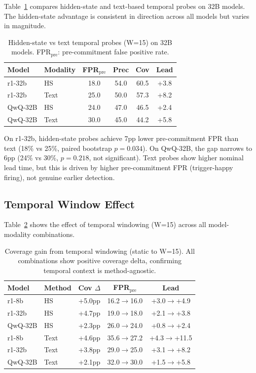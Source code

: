 \documentclass[11pt,a4paper]{article}
\begin{document}
Table~\ref{tab:hs_vs_text} compares hidden-state and text-based temporal probes on 32B models. The hidden-state advantage is consistent in direction across all models but varies in magnitude.

\begin{table}[t]
\centering
\small
\caption{Hidden-state vs text temporal probes (W=15) on 32B models. FPR$_\text{pre}$: pre-commitment false positive rate.}
\label{tab:hs_vs_text}
\begin{tabular}{llcccc}
\toprule
Model & Modality & FPR$_\text{pre}$ & Prec & Cov & Lead \\
\midrule
r1-32b & HS & 18.0 & 54.0 & 60.5 & +3.8 \\
r1-32b & Text & 25.0 & 50.0 & 57.3 & +8.2 \\
\midrule
QwQ-32B & HS & 24.0 & 47.0 & 46.5 & +2.4 \\
QwQ-32B & Text & 30.0 & 45.0 & 44.2 & +5.8 \\
\bottomrule
\end{tabular}
\end{table}

On r1-32b, hidden-state probes achieve 7pp lower pre-commitment FPR than text (18\% vs 25\%, paired bootstrap $p=0.034$). On QwQ-32B, the gap narrows to 6pp (24\% vs 30\%, $p=0.218$, not significant). Text probes show higher nominal lead time, but this is driven by higher pre-commitment FPR (trigger-happy firing), not genuine earlier detection.

\subsection{Temporal Window Effect}

Table~\ref{tab:temporal} shows the effect of temporal windowing (W=15) across all model-modality combinations.

\begin{table}[t]
\centering
\small
\caption{Coverage gain from temporal windowing (static to W=15). All combinations show positive coverage delta, confirming temporal context is method-agnostic.}
\label{tab:temporal}
\begin{tabular}{llccc}
\toprule
Model & Method & Cov $\Delta$ & FPR$_\text{pre}$ & Lead \\
\midrule
r1-8b & HS & +5.0pp & 16.2$\to$16.0 & +3.0$\to$+4.9 \\
r1-32b & HS & +4.7pp & 19.0$\to$18.0 & +2.1$\to$+3.8 \\
QwQ-32B & HS & +2.3pp & 26.0$\to$24.0 & +0.8$\to$+2.4 \\
\midrule
r1-8b & Text & +4.6pp & 35.6$\to$27.2 & +4.3$\to$+11.5 \\
r1-32b & Text & +3.8pp & 29.0$\to$25.0 & +3.1$\to$+8.2 \\
QwQ-32B & Text & +2.1pp & 32.0$\to$30.0 & +1.5$\to$+5.8 \\
\bottomrule
\end{tabular}
\end{table}
\end{document}
